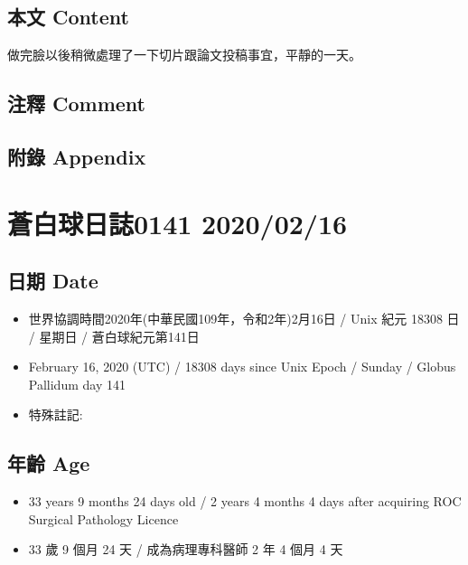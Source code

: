 \documentclass[a5paper, 12pt
]{book}
\providecommand{\tightlist}{%
  \setlength{\itemsep}{0pt}\setlength{\parskip}{0pt}}
\begin{document}
\hypertarget{ux672cux6587-content-76}{%
\subsection{本文 Content}\label{ux672cux6587-content-76}}

做完臉以後稍微處理了一下切片跟論文投稿事宜，平靜的一天。

\hypertarget{ux6ce8ux91cb-comment-75}{%
\subsection{注釋 Comment}\label{ux6ce8ux91cb-comment-75}}

\hypertarget{ux9644ux9304-appendix-76}{%
\subsection{附錄 Appendix}\label{ux9644ux9304-appendix-76}}

\hypertarget{ux84bcux767dux7403ux65e5ux8a8c0141-20200216}{%
\section{蒼白球日誌0141
2020/02/16}\label{ux84bcux767dux7403ux65e5ux8a8c0141-20200216}}

\hypertarget{ux65e5ux671f-date-77}{%
\subsection{日期 Date}\label{ux65e5ux671f-date-77}}

\begin{itemize}
\tightlist
\item
  世界協調時間2020年(中華民國109年，令和2年)2月16日 / Unix 紀元 18308 日
  / 星期日 / 蒼白球紀元第141日
\item
  February 16, 2020 (UTC) / 18308 days since Unix Epoch / Sunday /
  Globus Pallidum day 141
\item
  特殊註記:
\end{itemize}

\hypertarget{ux5e74ux9f61-age-77}{%
\subsection{年齡 Age}\label{ux5e74ux9f61-age-77}}

\begin{itemize}
\tightlist
\item
  33 years 9 months 24 days old / 2 years 4 months 4 days after
  acquiring ROC Surgical Pathology Licence
\item
  33 歲 9 個月 24 天 / 成為病理專科醫師 2 年 4 個月 4 天
\end{itemize}
\end{document}
